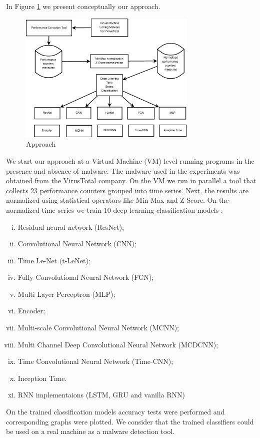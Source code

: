 \documentclass[conference]{IEEEtran}
\begin{document}
In Figure \ref{fig:approach} we present conceptually our approach.
\begin{figure}[!ht]
\centering
\includegraphics[width=8.5cm]{fig-approach.eps}
\caption{Approach}
\label{fig:approach}
\end{figure}

We start our approach at a Virtual Machine (VM) level running programs in the presence and absence of malware. The malware used in the experiments was obtained from the VirusTotal \cite{VirusTotal2021} company.
On the VM we run in parallel a tool that collects 23 performance counters grouped into time series.
Next, the results are normalized using statistical operators like Min-Max and Z-Score.
On the normalized time series we train 10 deep learning classification models \cite{Fawaz2019}:
\begin{enumerate}[i)]
\item Residual neural network (ResNet);
\item Convolutional Neural Network (CNN);
\item Time Le-Net (t-LeNet);
\item Fully Convolutional Neural Network (FCN);
\item Multi Layer Perceptron (MLP);
\item Encoder;
\item Multi-scale Convolutional Neural Network (MCNN);
\item Multi Channel Deep Convolutional Neural Network (MCDCNN);
\item Time Convolutional Neural Network (Time-CNN);
\item Inception Time.
\item RNN implementaions (LSTM, GRU and vanilla RNN)\cite{azizi2018deep}
\end{enumerate}
On the trained classification models accuracy tests were performed and corresponding graphs were 
plotted. We consider that the trained classifiers could be used on a real machine as a malware detection 
tool.
\end{document}
